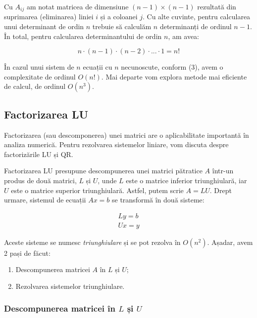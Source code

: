 \documentclass{exam}
\begin{document}
\par Cu $A_{ij}$ am notat matricea de dimensiune $(n - 1) \times (n - 1)$
rezultată din suprimarea (eliminarea) liniei $i$ și a coloanei $j$. Cu alte
cuvinte, pentru calcularea unui determinant de ordin $n$ trebuie să calculăm
$n$ determinanți de ordinul $n - 1$. În total, pentru calcularea determinantului
de ordin $n$, am avea:

\begin{equation}
	n \cdot (n - 1) \cdot (n - 2) \cdot ... \cdot 1 = n!
\end{equation}

\par În cazul unui sistem de $n$ ecuații cu $n$ necunoscute, conform (3),
avem o complexitate de ordinul $O(n!)$. Mai departe vom explora metode mai
eficiente de calcul, de ordinul $O(n^3)$.

\newpage
\subsection{Factorizarea LU}

\par Factorizarea (sau descomponerea) unei matrici are o aplicabilitate importantă
în analiza numerică. Pentru rezolvarea sistemelor liniare, vom discuta despre
factorizările LU și QR.

\par Factorizarea LU presupune descompunerea unei matrici pătratice $A$ într-un
produs de două matrici, $L$ și $U$, unde $L$ este o matrice inferior
triunghiulară, iar $U$ este o matrice superior triunghiulară. Astfel, putem
scrie $A = LU$. Drept urmare, sistemul de ecuații $Ax = b$ se transformă în două
sisteme:

\begin{gather*}
	Ly = b \\
	Ux = y
\end{gather*}

\par Aceste sisteme se numesc \textit{triunghiulare} și se pot rezolva în $O(n^2)$.
Așadar, avem 2 pași de făcut:

\begin{enumerate}
	\item Descompunerea matricei $A$ în $L$ și $U$;
	\item Rezolvarea sistemelor triunghiulare.
\end{enumerate}

\subsubsection{Descompunerea matricei în $L$ și $U$}
\end{document}
